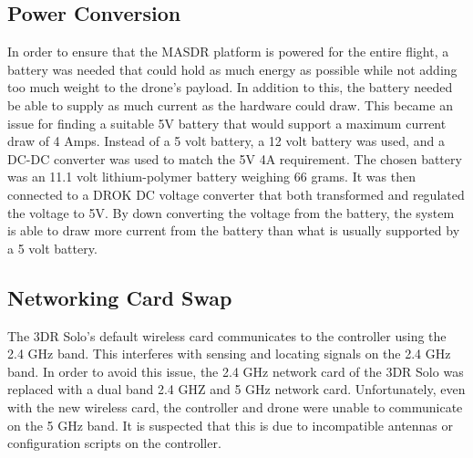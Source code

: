 \subsection{Power Conversion}
In order to ensure that the MASDR platform is powered for the entire flight, a battery was needed that could hold as much energy as possible while not adding too much weight to the drone’s payload. In addition to this, the battery needed be able to supply as much current as the hardware could draw. This became an issue for finding a suitable 5V battery that would support a maximum current draw of 4 Amps. Instead of a 5 volt battery, a 12 volt battery was used, and a DC-DC converter was used to match the 5V 4A requirement. The chosen battery was an 11.1 volt lithium-polymer battery weighing 66 grams. It was then connected to a DROK DC voltage converter that both transformed and regulated the voltage to 5V. By down converting the voltage from the battery, the system is able to draw more current from the battery than what is usually supported by a 5 volt battery.
\subsection{Networking Card Swap}
The 3DR Solo’s default wireless card communicates to the controller using the 2.4 GHz band. This interferes with sensing and locating signals on the 2.4 GHz band. In order to avoid this issue, the 2.4 GHz network card of the 3DR Solo was replaced with a dual band 2.4 GHZ and 5 GHz network card. Unfortunately, even with the new wireless card, the controller and drone were unable to communicate on the 5 GHz band. It is suspected that this is due to incompatible antennas or configuration scripts on the controller.





